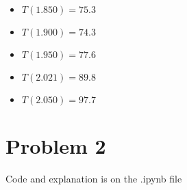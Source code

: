 \documentclass[12pt]{article}
\begin{document}
\begin{enumerate}
	\begin{itemize}
		\item $T(1.850) = 75.3$
		\item $T(1.900) = 74.3$
		\item $T(1.950) = 77.6$
		\item $T(2.021) = 89.8$
		\item $T(2.050) = 97.7$
	\end{itemize}
	
\section*{Problem 2}

Code and explanation is on the .ipynb file
	
\end{enumerate}
\end{document}

